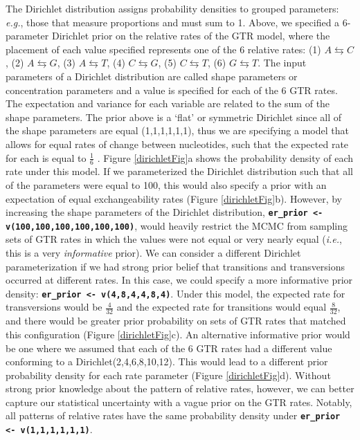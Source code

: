 \documentclass[11pt]{article}
\newcommand{\cl}[1]{{\texttt{\textbf{#1}}}}
\begin{document}
The Dirichlet distribution assigns probability densities to grouped parameters: {\it e.g.}, those that measure proportions and must sum to 1. 
Above, we specified a 6-parameter Dirichlet prior on the relative rates of the GTR model, where the placement of each value specified represents one of the 6 relative rates: (1) $A\leftrightarrows C$, (2) $A\leftrightarrows G$, (3) $A\leftrightarrows T$, (4) $C\leftrightarrows G$, (5) $C\leftrightarrows T$, (6) $G\leftrightarrows T$. 
The input parameters of a Dirichlet distribution are called shape parameters or concentration parameters and a value is specified for each of the 6 GTR rates. 
The expectation and variance for each variable are related to the sum of the shape parameters.
The prior above is a `flat' or symmetric Dirichlet since all of the shape parameters are equal (1,1,1,1,1,1), thus we are specifying a model that allows for equal rates of change between nucleotides, such that the expected rate for each is equal to $\frac{1}{6}$ \citep{zwickl04}.
Figure \ref{dirichletFig}a shows the probability density of each rate under this model.
If we parameterized the Dirichlet distribution such that all of the parameters were equal to 100, this would also specify a prior with an expectation of equal exchangeability rates (Figure \ref{dirichletFig}b). 
However, by increasing the shape parameters of the Dirichlet distribution, \cl{er\_prior <- v(100,100,100,100,100,100)}, would heavily restrict the MCMC from sampling sets of GTR rates in which the values were not equal or very nearly equal ({\it i.e.}, this is a very {\em informative} prior). 
We can consider a different Dirichlet parameterization if we had strong prior belief that transitions and transversions occurred at different rates.
In this case, we could specify a more informative prior density: \cl{er\_prior <- v(4,8,4,4,8,4)}. 
Under this model, the expected rate for transversions would be $\frac{4}{32}$ and the expected rate for transitions would equal $\frac{8}{32}$, and there would be greater prior probability on sets of GTR rates that matched this configuration (Figure \ref{dirichletFig}c). 
An alternative informative prior would be one where we assumed that each of the 6 GTR rates had a different value conforming to a Dirichlet(2,4,6,8,10,12). 
This would lead to a different prior probability density for each rate parameter (Figure \ref{dirichletFig}d).
Without strong prior knowledge about the pattern of relative rates, however, we can better capture our statistical uncertainty with a vague prior on the GTR rates. 
Notably, all patterns of relative rates have the same probability density under \cl{er\_prior <- v(1,1,1,1,1,1)}.
\end{document}
